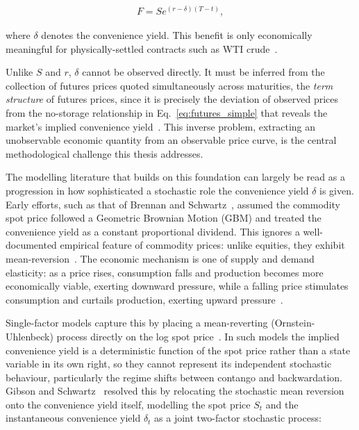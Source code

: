 \documentclass[11pt, a4paper]{article}
\begin{document}
\begin{align} \label{eq:futures_convenience}
F = Se^{(r-\delta)(T-t)},
\end{align}

where $\delta$ denotes the convenience yield. This benefit is only economically meaningful for physically-settled contracts such as WTI crude~\cite{Hull2022OptionsDerivatives}.

Unlike $S$ and $r$, $\delta$ cannot be observed directly. It must be inferred from the collection of futures prices quoted simultaneously across maturities, the \textit{term structure} of futures prices, since it is precisely the deviation of observed prices from the no-storage relationship in Eq.~\ref{eq:futures_simple} that reveals the market's implied convenience yield~\cite{Liu2009No-ArbitrageStructures}. This inverse problem, extracting an unobservable economic quantity from an observable price curve, is the central methodological challenge this thesis addresses.

\label{sec:lit_commodity}

The modelling literature that builds on this foundation can largely be read as a progression in how sophisticated a stochastic role the convenience yield $\delta$ is given. Early efforts, such as that of Brennan and Schwartz~\cite{Brennan1985EvaluatingInvestments}, assumed the commodity spot price followed a Geometric Brownian Motion (GBM) and treated the convenience yield as a constant proportional dividend. This ignores a well-documented empirical feature of commodity prices: unlike equities, they exhibit mean-reversion~\cite{Hull2022OptionsDerivatives, Gibson1990StochasticClaims}. The economic mechanism is one of supply and demand elasticity: as a price rises, consumption falls and production becomes more economically viable, exerting downward pressure, while a falling price stimulates consumption and curtails production, exerting upward pressure~\cite{Hull2022OptionsDerivatives}.

Single-factor models capture this by placing a mean-reverting (Ornstein-Uhlenbeck) process directly on the log spot price~\cite{Hull2022OptionsDerivatives, Schwartz1997TheHedging}. In such models the implied convenience yield is a deterministic function of the spot price rather than a state variable in its own right, so they cannot represent its independent stochastic behaviour, particularly the regime shifts between contango and backwardation. Gibson and Schwartz~\cite{Gibson1990StochasticClaims} resolved this by relocating the stochastic mean reversion onto the convenience yield itself, modelling the spot price $S_t$ and the instantaneous convenience yield $\delta_t$ as a joint two-factor stochastic process:
\end{document}
